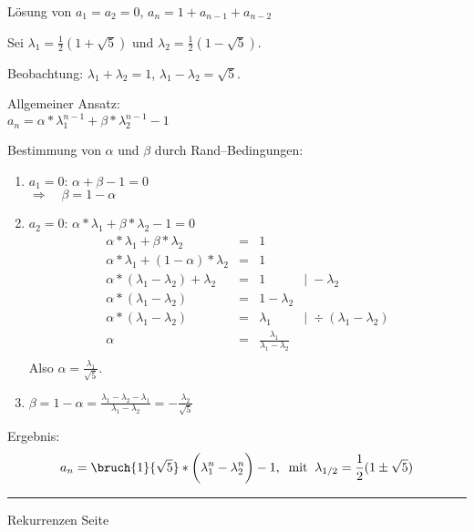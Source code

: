 
\begin{slide}{}
\normalsize

\begin{center}
L\"osung von $a_1 = a_2 = 0$, $a_n = 1 + a_{n-1} + a_{n-2}$
\end{center}
\vspace*{0.5cm}

\footnotesize
Sei $\lambda_1 = \frac{1}{2}(1 + \sqrt{5})$ und $\lambda_2 = \frac{1}{2}(1 - \sqrt{5})$.

Beobachtung: $\lambda_1 + \lambda_2 = 1$, $\lambda_1 - \lambda_2 = \sqrt{5}$.

Allgemeiner Ansatz: \\[0.3cm]
\hspace*{1.3cm} $a_n = \alpha * \lambda_1^{n-1} + \beta * \lambda_2^{n-1} - 1$

Bestimmung von $\alpha$ und $\beta$ durch Rand--Bedingungen:
\begin{enumerate}
\item $a_1 = 0$: \quad $\alpha + \beta - 1 = 0$ \\[0.3cm]
      \hspace*{1.3cm} $\Rightarrow \quad \beta = 1 - \alpha$
\item $a_2 = 0$: \quad $\alpha * \lambda_1 + \beta * \lambda_2 - 1 = 0$ 
      $$
      \begin{array}{lcll}
         \alpha * \lambda_1 + \beta * \lambda_2         & = & 1 \\[0.3cm]
         \alpha * \lambda_1 + (1 - \alpha) * \lambda_2  & = & 1 \\[0.3cm]
         \alpha * (\lambda_1 - \lambda_2) + \lambda_2   & = & 1              &  \mid \; - \lambda_2 \\[0.3cm]
         \alpha * (\lambda_1 - \lambda_2)               & = & 1 - \lambda_2  &   \\[0.3cm]
         \alpha * (\lambda_1 - \lambda_2)               & = & \lambda_1      &  \mid \; \div (\lambda_1 - \lambda_2) \\[0.3cm]
         \alpha                                         & = & \frac{\displaystyle \lambda_1}{\displaystyle \lambda_1 - \lambda_2} &   \\
      \end{array}
      $$
      Also $\alpha = \frac{\displaystyle \lambda_1}{\displaystyle \sqrt{5}}$.

\item $\beta = 1 - \alpha = \frac{\displaystyle \lambda_1 - \lambda_2 - \lambda_1}{\displaystyle\lambda_1 - \lambda_2}
             = - \frac{\displaystyle \lambda_2}{\displaystyle \sqrt{5}}$
\end{enumerate}
Ergebnis: 
$$ a_n =  \bruch{1}{\sqrt{5}} * \bigg(\lambda_1^n - \lambda_2^n \bigg) - 1, \;\;\mbox{mit}\;\;
\lambda_{1/2} = \frac{1}{2}(1 \pm \sqrt{5}) $$


\vspace*{\fill}
\tiny \addtocounter{mypage}{1}
\rule{17cm}{1mm}
Rekurrenzen  \hspace*{\fill} Seite 
\end{slide}

